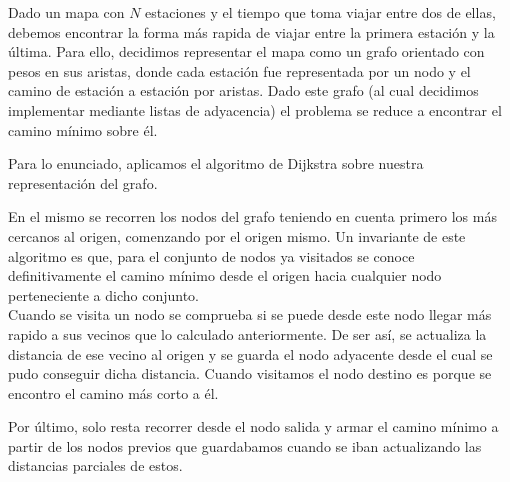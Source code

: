 Dado un mapa con $N$ estaciones y el tiempo que toma viajar entre dos de ellas, debemos encontrar la forma más rapida de viajar entre la primera estación y la \'ultima. Para ello, decidimos representar el mapa como un grafo orientado con pesos en sus aristas, donde cada estaci\'on fue representada por un nodo y el camino de estaci\'on a estaci\'on por aristas. Dado este grafo (al cual decidimos implementar mediante listas de adyacencia) el problema se reduce a encontrar el camino mínimo sobre él.

Para lo enunciado, aplicamos el algoritmo de Dijkstra sobre nuestra representación del grafo. 

En el mismo se recorren los nodos del grafo teniendo en cuenta primero los más cercanos al origen, comenzando por el origen mismo. Un invariante de este algoritmo es que, para el conjunto de nodos ya visitados se conoce definitivamente el camino mínimo desde el origen hacia cualquier nodo perteneciente a dicho conjunto.\\
Cuando se visita un nodo se comprueba si se puede desde este nodo llegar más rapido a sus vecinos que lo calculado anteriormente. De ser así, se actualiza la distancia de ese vecino al origen y se guarda el nodo adyacente desde  el cual se pudo conseguir dicha distancia. Cuando visitamos el nodo destino es porque se encontro el camino más corto a él.

Por \'ultimo, solo resta recorrer desde el nodo salida y armar el camino mínimo a partir de los nodos previos que guardabamos cuando se iban actualizando las distancias parciales de estos.
